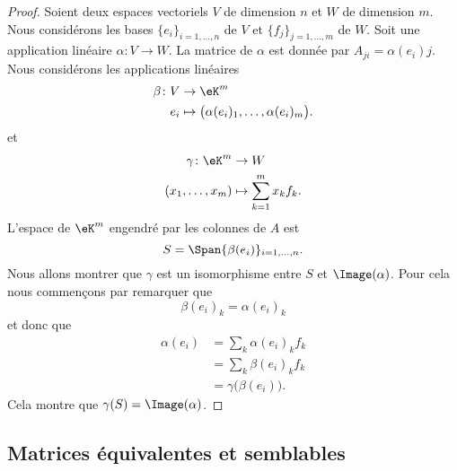 \begin{proof}
	Soient deux espaces vectoriels \( V\) de dimension \( n\) et \( W\) de dimension \( m\). Nous considérons les bases \( \{ e_i \}_{i=1,\ldots,n}\) de \( V\) et \( \{ f_j \}_{j=1,\ldots,m}\) de \( W\). Soit une application linéaire \(\alpha \colon V\to W  \). La matrice de \( \alpha\) est donnée par \( A_{ji}=\alpha(e_i)j\). Nous considérons les applications linéaires
	\begin{equation}
		\begin{aligned}
			\beta\colon V & \to \eK^m                                               \\
			e_i           & \mapsto \big( \alpha(e_i)_1,\ldots,\alpha(e_i)_m \big).
		\end{aligned}
	\end{equation}
	et
	\begin{equation}
		\begin{aligned}
			\gamma\colon \eK^m & \to W                       \\
			(x_1,\ldots,x_m)   & \mapsto \sum_{k=1}^mx_kf_k.
		\end{aligned}
	\end{equation}
	L'espace de \( \eK^m\) engendré par les colonnes de \( A\) est
	\begin{equation}
		S=\Span\{ \beta(e_i) \}_{i=1,\ldots,n}.
	\end{equation}
	Nous allons montrer que \( \gamma\) est un isomorphisme entre \( S\) et \( \Image(\alpha)\). Pour cela nous commençons par remarquer que
	\begin{equation}
		\beta(e_i)_k=\alpha(e_i)_k
	\end{equation}
	et donc que
	\begin{subequations}
		\begin{align}
			\alpha(e_i) & =\sum_k\alpha(e_i)_kf_k        \\
			            & =\sum_k\beta(e_i)_kf_k         \\
			            & =\gamma\big( \beta(e_i) \big).
		\end{align}
	\end{subequations}
	Cela montre que \( \gamma(S)=\Image(\alpha)\).
\end{proof}

\subsection{Matrices équivalentes et semblables}

